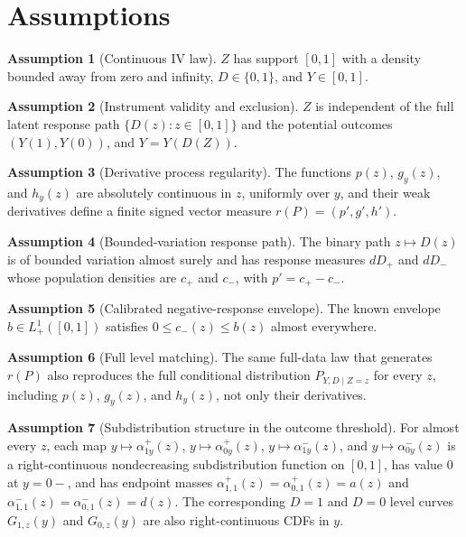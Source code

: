 \documentclass[11pt]{article}
\theoremstyle{definition}
\newtheorem{assumption}{Assumption}
\theoremstyle{plain}
\theoremstyle{remark}
\begin{document}
\section{Assumptions}
\begin{assumption}[Continuous IV law]\label{ass:law}
\(Z\) has support \([0,1]\) with a density bounded away from zero and infinity, \(D\in\{0,1\}\), and \(Y\in[0,1]\).
\end{assumption}

\begin{assumption}[Instrument validity and exclusion]\label{ass:iv}
\(Z\) is independent of the full latent response path \(\{D(z):z\in[0,1]\}\) and the potential outcomes \((Y(1),Y(0))\), and \(Y=Y(D(Z))\).
\end{assumption}

\begin{assumption}[Derivative process regularity]\label{ass:regular}
The functions \(p(z)\), \(g_y(z)\), and \(h_y(z)\) are absolutely continuous in \(z\), uniformly over \(y\), and their weak derivatives define a finite signed vector measure \(r(P)=(p',g',h')\).
\end{assumption}

\begin{assumption}[Bounded-variation response path]\label{ass:bv}
The binary path \(z\mapsto D(z)\) is of bounded variation almost surely and has response measures \(dD_+\) and \(dD_-\) whose population densities are \(c_+\) and \(c_-\), with \(p'=c_+-c_-\).
\end{assumption}

\begin{assumption}[Calibrated negative-response envelope]\label{ass:envelope}
The known envelope \(b\in L^1_+([0,1])\) satisfies \(0\le c_-(z)\le b(z)\) almost everywhere.
\end{assumption}

\begin{assumption}[Full level matching]\label{ass:levels}
The same full-data law that generates \(r(P)\) also reproduces the full conditional distribution \(P_{Y,D\mid Z=z}\) for every \(z\), including \(p(z)\), \(g_y(z)\), and \(h_y(z)\), not only their derivatives.
\end{assumption}

\begin{assumption}[Subdistribution structure in the outcome threshold]\label{ass:subcdf}
For almost every \(z\), each map \(y\mapsto \alpha^+_{1y}(z)\), \(y\mapsto \alpha^+_{0y}(z)\), \(y\mapsto \alpha^-_{1y}(z)\), and \(y\mapsto \alpha^-_{0y}(z)\) is a right-continuous nondecreasing subdistribution function on \([0,1]\), has value \(0\) at \(y=0-\), and has endpoint masses \(\alpha^+_{1,1}(z)=\alpha^+_{0,1}(z)=a(z)\) and \(\alpha^-_{1,1}(z)=\alpha^-_{0,1}(z)=d(z)\).  The corresponding \(D=1\) and \(D=0\) level curves \(G_{1,z}(y)\) and \(G_{0,z}(y)\) are also right-continuous CDFs in \(y\).
\end{assumption}
\end{document}
